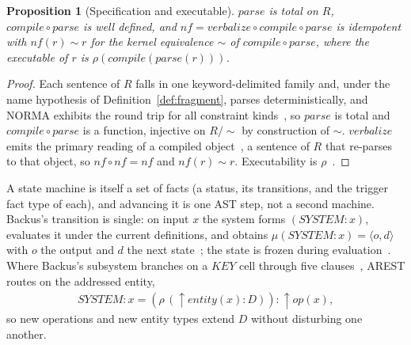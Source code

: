 \documentclass[10pt,twocolumn]{article}
\theoremstyle{plain}
\newtheorem{proposition}{Proposition}
\theoremstyle{definition}
\begin{document}
\begin{proposition}[Specification and executable]\label{prop:spec}
$\mathit{parse}$ is total on $R$, $\mathit{compile}\circ\mathit{parse}$ is well defined, and $\mathit{nf}=\mathit{verbalize}\circ\mathit{compile}\circ\mathit{parse}$ is idempotent with $\mathit{nf}(r)\sim r$ for the kernel equivalence $\sim$ of $\mathit{compile}\circ\mathit{parse}$, where the executable of $r$ is $\rho(\mathit{compile}(\mathit{parse}(r)))$.
\end{proposition}
\begin{proof}
Each sentence of $R$ falls in one keyword-delimited family and, under the name hypothesis of Definition~\ref{def:fragment}, parses deterministically, and NORMA exhibits the round trip for all constraint kinds~\cite{norma}, so $\mathit{parse}$ is total and $\mathit{compile}\circ\mathit{parse}$ is a function, injective on $R/{\sim}$ by construction of $\sim$. $\mathit{verbalize}$ emits the primary reading of a compiled object~\cite{halpin06}, a sentence of $R$ that re-parses to that object, so $\mathit{nf}\circ\mathit{nf}=\mathit{nf}$ and $\mathit{nf}(r)\sim r$. Executability is $\rho$~\cite[Sec.\,13.4]{backus78}.
\end{proof}

\noindent A state machine is itself a set of facts (a status, its transitions, and the trigger fact type of each), and advancing it is one AST step, not a second machine. Backus's transition is single: on input $x$ the system forms $(\mathit{SYSTEM}\!:\!x)$, evaluates it under the current definitions, and obtains $\mu(\mathit{SYSTEM}\!:\!x)=\langle o,d\rangle$ with $o$ the output and $d$ the next state~\cite[Sec.\,14.3.1]{backus78}; the state is frozen during evaluation~\cite[Sec.\,14.6]{backus78}. Where Backus's subsystem branches on a $\mathit{KEY}$ cell through five clauses~\cite[Sec.\,14.4.2]{backus78}, AREST routes on the addressed entity,
\begin{align}
\mathit{SYSTEM}\!:\!x = (\rho\,(\uparrow\!\mathit{entity}(x)\!:\!D))\!:\!\uparrow\!\mathit{op}(x), \label{eq:sys}
\end{align}
so new operations and new entity types extend $D$ without disturbing one another.
\end{document}
